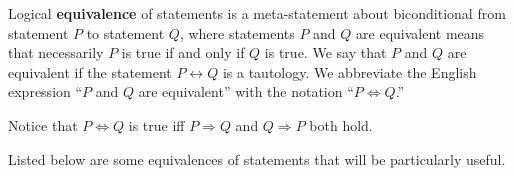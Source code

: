 \documentclass[]{article}
\begin{document}
\begin{defn}[Equivalence] Logical \textbf{equivalence} of statements is a meta-statement about biconditional from statement $P$ to statement $Q$, where statements $P$ and $Q$ are equivalent means that necessarily $P$ is true if and only if $Q$ is true. We say that $P$ and $Q$ are equivalent if the statement $P\leftrightarrow Q$ is a tautology. We abbreviate the English expression ``$P$ and $Q$ are equivalent'' with the notation ``$P\Leftrightarrow Q$.'' 
\end{defn} 
\begin{rem} Notice that $P \Leftrightarrow Q$ is true iff $P \Rightarrow Q$ and $Q \Rightarrow P$ both hold.
\end{rem}
Listed below are some equivalences of statements that will be particularly useful.
\end{document}

